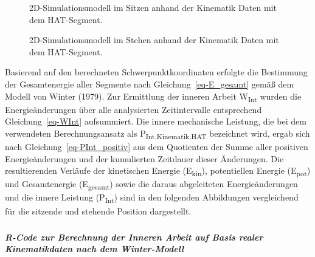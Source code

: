 \documentclass[
  letterpaper,
  DIV=11]{scrartcl}
\makeatletter
\let\oldsubparagraph\subparagraph
\renewcommand{\subparagraph}{
    \@ifstar
      \xxxSubParagraphStar
      \xxxSubParagraphNoStar
  }
\newcommand{\xxxSubParagraphStar}[1]{\oldsubparagraph*{#1}\mbox{}}
\newcommand{\xxxSubParagraphNoStar}[1]{\oldsubparagraph{#1}\mbox{}}
\makeatother
\begin{document}
\begin{figure}


\caption{\label{fig-Kinematik_Simulationsmodell_Sitzen_HAT}2D-Simulationsmodell
im Sitzen anhand der Kinematik Daten mit dem HAT-Segment.}

\end{figure}%

\begin{figure}


\caption{\label{fig-Kinematik_Simulationsmodell_Stehen_HAT}2D-Simulationsmodell
im Stehen anhand der Kinematik Daten mit dem HAT-Segment.}

\end{figure}%

Basierend auf den berechneten Schwerpunktkoordinaten erfolgte die
Bestimmung der Gesamtenergie aller Segmente nach
Gleichung~\ref{eq-E_gesamt} gemäß dem Modell von Winter (1979). Zur
Ermittlung der inneren Arbeit W\textsubscript{Int} wurden die
Energieänderungen über alle analysierten Zeitintervalle entsprechend
Gleichung~\ref{eq-WInt} aufsummiert. Die innere mechanische Leistung,
die bei dem verwendeten Berechnungsansatz als
P\textsubscript{Int,Kinematik,HAT} bezeichnet wird, ergab sich nach
Gleichung~\ref{eq-PInt_positiv} aus dem Quotienten der Summe aller
positiven Energieänderungen und der kumulierten Zeitdauer dieser
Änderungen. Die resultierenden Verläufe der kinetischen Energie
(E\textsubscript{kin}), potentiellen Energie (E\textsubscript{pot}) und
Gesamtenergie (E\textsubscript{gesamt}) sowie die daraus abgeleiteten
Energieänderungen und die innere Leistung (P\textsubscript{Int}) sind in
den folgenden Abbildungen vergleichend für die sitzende und stehende
Position dargestellt.

\subparagraph{\texorpdfstring{\textbf{\emph{R-Code zur Berechnung der
Inneren Arbeit auf Basis realer Kinematikdaten nach dem
Winter-Modell}}}{R-Code zur Berechnung der Inneren Arbeit auf Basis realer Kinematikdaten nach dem Winter-Modell}}\label{r-code-zur-berechnung-der-inneren-arbeit-auf-basis-realer-kinematikdaten-nach-dem-winter-modell}
\end{document}
